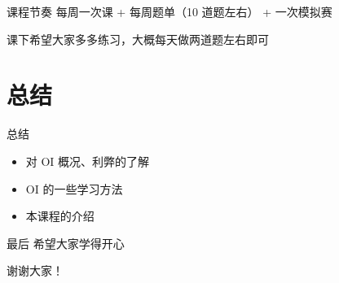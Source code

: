 \documentclass[11pt,aspectratio=169]{beamer}
\begin{document}
\begin{frame}{课程节奏}
    每周一次课 + 每周题单（10 道题左右） + 一次模拟赛

    课下希望大家多多练习，大概每天做两道题左右即可
\end{frame}
\section{总结}

\begin{frame}{总结}
\begin{itemize}
    \item 对 OI 概况、利弊的了解
    \item OI 的一些学习方法
    \item 本课程的介绍
\end{itemize}
\end{frame}

\begin{frame}{最后}
希望大家学得开心

\pause
\centerline{\Large 谢谢大家！}
\end{frame}
\end{document}
